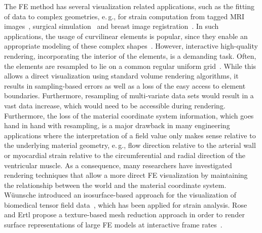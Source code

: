 \documentclass[review,journal]{vgtc}         %
\begin{document}
The FE method has several visualization related applications, such as the fitting of data to complex geometries, e.\,g., for strain computation from tagged MRI images~\cite{Young00}, surgical simulation~\cite{Berkley04} and breast image registration~\cite{lee10deformation}. In such applications, the usage of curvilinear elements is popular, since they enable an appropriate modeling of these complex shapes~\cite{gelberg90visTechGrid,smith05ventricularmechanics}. However, interactive high-quality rendering, incorporating the interior of the elements, is a demanding task. Often, the elements are resampled to lie on a common regular uniform grid~\cite{Wihelms90}. While this allows a direct visualization using standard volume rendering algorithms, it results in sampling-based errors as well as a loss of the easy access to element boundaries. Furthermore, resampling of multi-variate data sets would result in a vast data increase, which would need to be accessible during rendering. Furthermore, the loss of the material coordinate system information, which goes hand in hand with resampling, is a major drawback in many engineering applications where the interpretation of a field value only makes sense relative to the underlying material geometry, e.\,g., flow direction relative to the arterial wall or myocardial strain relative to the circumferential and radial direction of the ventricular muscle. As a consequence, many researchers have investigated rendering techniques that allow a more direct FE visualization by maintaining the relationship between the world and the material coordinate system. W{\"u}unsche introduced an isosurface-based approach for the visualization of biomedical tensor field data~\cite{wunsche03femvis}, which has been applied for strain analysis. Rose and Ertl propose a texture-based mesh reduction approach in order to render surface representations of large FE models at interactive frame rates~\cite{rose03femvis}. 
\end{document}
